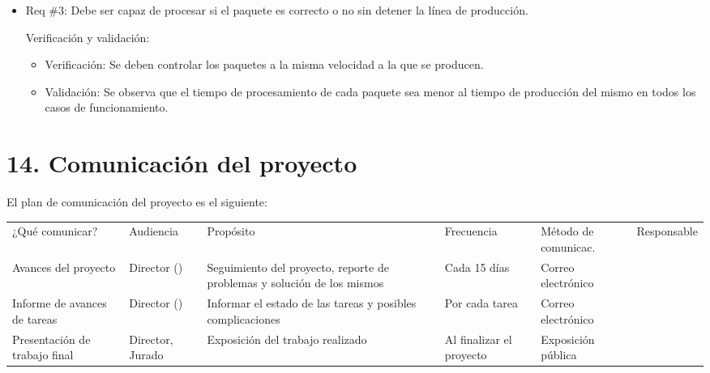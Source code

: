 \documentclass[11pt]{charter}
\begin{document}
\begin{itemize} 
\item Req \#3: Debe ser capaz de procesar si el paquete es correcto o no sin detener la línea de producción.

Verificación y validación:

\begin{itemize}
\item Verificación: Se deben controlar los paquetes a la misma velocidad a la que se producen.
\item Validación: Se observa que el tiempo de procesamiento de cada paquete sea menor al tiempo de producción del mismo en todos los casos de funcionamiento.

\end{itemize}

\end{itemize}



\newpage
\section{14. Comunicación del proyecto}
\label{sec:comunicaciones}

El plan de comunicación del proyecto es el siguiente:

\begin{table}[htpb]
\centering
\begin{tabularx}{\linewidth}{@{}|X|C{2.4cm}|C{3cm}|C{1.8cm}|C{2cm}|C{2.1cm}|@{}}
\hline
{} 
           \\ \hline
{} 
¿Qué comunicar? & Audiencia & Propósito & Frecuencia & Método de comunicac. & Responsable \\ \hline
Avances del proyecto			&Director (\supname	)	&Seguimiento del proyecto, reporte de problemas y solución de los mismos           &Cada 15 días            &Correo electrónico                       &\authorname            \\ \hline
Informe de avances de tareas	&Director (\supname	)	&Informar el estado de las tareas y posibles complicaciones           &Por cada tarea                                 &Correo electrónico  &\authorname     \\ \hline
Presentación de trabajo final	&Director, Jurado				&Exposición del trabajo realizado           &Al finalizar el proyecto &Exposición pública                      &\authorname         \\ \hline

\end{tabularx}
\end{table}
\end{document}
